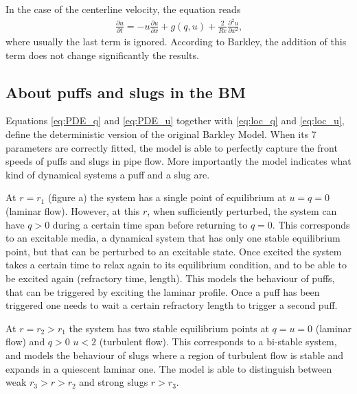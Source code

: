\documentclass{article}
\begin{document}
In the case of the centerline velocity, the equation reads
\begin{align}
\frac{\partial u}{\partial t}=-u\frac{\partial u}{\partial x} + g\left(q,u \right) + \frac{2}{Re}\frac{\partial^{2} u}{\partial x^{2}} \text{,}
\label{eq:PDE_u}
\end{align}
where usually the last term is ignored. According to Barkley, the addition of this term does not change significantly the results.





\subsection{About puffs and slugs in the BM}
Equations \ref{eq:PDE_q} and \ref{eq:PDE_u} together with \ref{eq:loc_q} and \ref{eq:loc_u}, define the deterministic version of the original Barkley Model. When its 7 parameters are correctly fitted, the model is able to perfectly capture the front speeds of puffs and slugs in pipe flow. More importantly the model indicates what kind of dynamical systems a puff and a slug are.

At $r=r_{1}$ (figure a) the system has a single point of equilibrium at $u=q=0$ (laminar flow). However, at this $r$, when sufficiently perturbed, the system can have $q>0$ during a certain time span before returning to $q=0$. This corresponds to an excitable media, a dynamical system that has only one stable equilibrium point, but that can be perturbed to an excitable state. Once excited the system takes a certain time to relax again to its equilibrium condition, and to be able to be excited again (refractory time, length). This models the behaviour of puffs, that can be triggered by exciting the laminar profile. Once a puff has been triggered one needs to wait a certain refractory length to trigger a second puff. 

At $r=r_{2}>r_{1}$ the system has two stable equilibrium points at $q=u=0$ (laminar flow) and $q>0$ $u<2$ (turbulent flow). This corresponds to a bi-stable system, and models the behaviour of slugs where a region of turbulent flow is stable and expands in a quiescent laminar one. The model is able to distinguish between weak $r_{3}>r>r_{2}$ and strong slugs $r>r_{3}$. 





\end{document}

